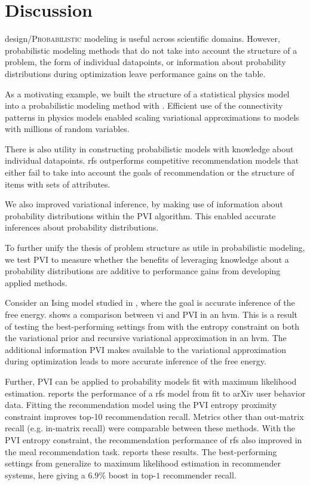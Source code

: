 \chapter{Discussion}
\label{ch:discussion}
\lettrine[image=true,lines=3]{design/P}{robabilistic} modeling is useful across scientific domains. However, probabilistic modeling methods that do not take into account the structure of a problem, the form of individual datapoints, or information about probability distributions during optimization leave performance gains on the table.

As a motivating example, we built the structure of a statistical physics model into a probabilistic modeling method with . Efficient use of the connectivity patterns in physics models enabled scaling variational approximations to models with millions of random variables.

There is also utility in constructing probabilistic models with knowledge about individual datapoints. \acrlong{rfs} outperforms competitive recommendation models that either fail to take into account the goals of recommendation or the structure of items with sets of attributes.

We also improved variational inference, by making use of information about probability distributions within the \acrlong{PVI} algorithm. This enabled accurate inferences about probability distributions.

To further unify the thesis of problem structure as utile in probabilistic modeling, we test \acrlong{PVI} to measure whether the benefits of leveraging knowledge about a probability distributions are additive to performance gains from developing applied methods.


Consider an Ising model studied in , where the goal is accurate inference of the free energy.  shows a comparison between \gls{vi} and \gls{PVI} in an \gls{hvm}. This is a result of testing the best-performing settings from  with the entropy constraint on both the variational prior and recursive variational approximation in an \gls{hvm}. The additional information \gls{PVI} makes available to the variational approximation during optimization leads to more accurate inference of the free energy.

Further, \gls{PVI} can be applied to probability models fit with maximum likelihood estimation.  reports the performance of a \gls{rfs} model from  fit to arXiv user behavior data. Fitting the recommendation model using the \gls{PVI} entropy proximity constraint improves top-10 recommendation recall. Metrics other than out-matrix recall (e.g. in-matrix recall) were comparable between these methods. With the \gls{PVI} entropy constraint, the recommendation performance of \gls{rfs} also improved in the meal recommendation task.  reports these results. The best-performing settings from  generalize to maximum likelihood estimation in recommender systems, here giving a $6.9\%$ boost in top-$1$ recommender recall.

